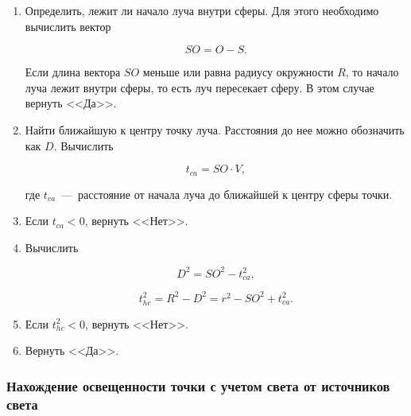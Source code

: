 \begin{enumerate}
	\item Определить, лежит ли начало луча внутри сферы. Для этого необходимо вычислить вектор 
	
	\begin{equation}
		SO = O - S.
	\end{equation}
	
	Если длина вектора $SO$ меньше или равна радиусу окружности $R$, то начало луча лежит внутри сферы, то есть луч пересекает сферу. В этом случае вернуть <<Да>>.
	
	\item Найти ближайшую к центру точку луча. Расстояния до нее можно обозначить как $D$. Вычислить
	
	\begin{equation}
		t_{ca} = SO \cdot V,
	\end{equation}
	
	где $t_{ca}$~---~расстояние от начала луча до ближайшей к центру сферы точки.
	
	\item Если $t_{ca} < 0$, вернуть <<Нет>>.
	\item Вычислить
	
	\begin{equation}
		D^2 = SO^2 - t_{ca}^2,
	\end{equation}
	
	\begin{equation}
		t_{hc}^2 = R^2 - D^2 = r^2 - SO^2 + t_{ca}^2.
	\end{equation}
	
	\item Если $t_{hc}^2 < 0$, вернуть <<Нет>>.
	\item Вернуть <<Да>>.
\end{enumerate}

\subsubsection{Нахождение освещенности точки с учетом света от источников света}

